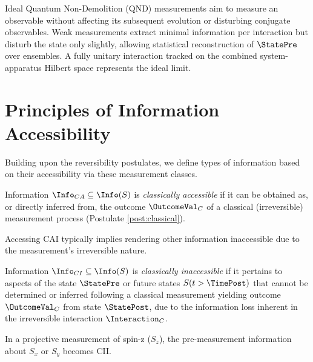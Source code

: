 	\begin{example}
		Ideal Quantum Non-Demolition (QND) measurements aim to measure an observable without affecting its subsequent evolution or disturbing conjugate observables. Weak measurements extract minimal information per interaction but disturb the state only slightly, allowing statistical reconstruction of $\StatePre$ over ensembles. A fully unitary interaction tracked on the combined system-apparatus Hilbert space represents the ideal limit.
	\end{example}
	
	
	\section{Principles of Information Accessibility}
	
	Building upon the reversibility postulates, we define types of information based on their accessibility via these measurement classes.
	
	\begin{principle} \label{princ:CAI}
		Information $\Info_{CA} \subseteq \Info(S)$ is \emph{classically accessible} if it can be obtained as, or directly inferred from, the outcome $\OutcomeVal_C$ of a classical (irreversible) measurement process (Postulate \ref{post:classical}).
	\end{principle}
	\begin{remark}
		Accessing CAI typically implies rendering other information inaccessible due to the measurement's irreversible nature.
	\end{remark}
	
	\begin{principle} \label{princ:CII}
		Information $\Info_{CI} \subseteq \Info(S)$ is \emph{classically inaccessible} if it pertains to aspects of the state $\StatePre$ or future states $S(t > \TimePost)$ that cannot be determined or inferred following a classical measurement yielding outcome $\OutcomeVal_C$ from state $\StatePost$, due to the information loss inherent in the irreversible interaction $\Interaction_C$.
	\end{principle}
	\begin{example}
		In a projective measurement of spin-z ($S_z$), the pre-measurement information about $S_x$ or $S_y$ becomes CII.
	\end{example}
	
